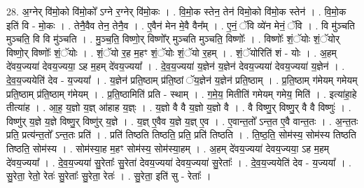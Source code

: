 \documentclass[17pt]{extarticle}
\begin{document}
28. अ॒ग्नेर् वि॑मो॒को वि॑मो॒को᳚ ऽग्ने र॒ग्नेर् वि॑मो॒कः । . वि॒मो॒क स्तेन॒ तेन॑ विमो॒को वि॑मो॒क स्तेन॑ । . वि॒मो॒क इति॑ वि - मो॒कः । . तेनै॒वैव तेन॒ तेनै॒व । . ए॒वैन॑ मेन मे॒वै वैन᳚म् । . ए॒नं॒ ॅवि व्ये॑न मेनं॒ ॅवि । . वि मु॑ञ्चति मुञ्चति॒ वि वि मु॑ञ्चति । . मु॒ञ्च॒ति॒ विष्णो॒र् विष्णो᳚र् मुञ्चति मुञ्चति॒ विष्णोः᳚ । . विष्णोः᳚ शं॒ॅयोः शं॒ॅयोर् विष्णो॒र् विष्णोः᳚ शं॒ॅयोः । . शं॒ॅयो र॒ह म॒हꣳ शं॒ॅयोः शं॒ॅयो र॒हम् । . शं॒ॅयोरिति॑ शं - योः । . अ॒हम् दे॑वय॒ज्यया॑ देवय॒ज्यया॒ ऽह म॒हम् दे॑वय॒ज्यया᳚ । . दे॒व॒य॒ज्यया॑ य॒ज्ञेन॑ य॒ज्ञेन॑ देवय॒ज्यया॑ देवय॒ज्यया॑ य॒ज्ञेन॑ । . दे॒व॒य॒ज्ययेति॑ देव - य॒ज्यया᳚ । . य॒ज्ञेन॑ प्रति॒ष्ठाम् प्र॑ति॒ष्ठां ॅय॒ज्ञेन॑ य॒ज्ञेन॑ प्रति॒ष्ठाम् । . प्र॒ति॒ष्ठाम् ग॑मेयम् गमेयम् प्रति॒ष्ठाम् प्र॑ति॒ष्ठाम् ग॑मेयम् । . प्र॒ति॒ष्ठामिति॑ प्रति - स्थाम् । . ग॒मे॒य॒ मितीति॑ गमेयम् गमेय॒ मिति॑ । . इत्या॑हा॒हे तीत्या॑ह । . आ॒ह॒ य॒ज्ञो य॒ज्ञ् आ॑हाह य॒ज्ञ्ः । . य॒ज्ञो वै वै य॒ज्ञो य॒ज्ञो वै । . वै विष्णु॒र् विष्णु॒र् वै वै विष्णुः॑ । . विष्णु॑र् य॒ज्ञे य॒ज्ञे विष्णु॒र् विष्णु॑र् य॒ज्ञे । . य॒ज्ञ् ए॒वैव य॒ज्ञे य॒ज्ञ् ए॒व । . ए॒वान्त॒तो᳚ ऽन्त॒त ए॒वै वान्त॒तः । . अ॒न्त॒तः प्रति॒ प्रत्य॑न्त॒तो᳚ ऽन्त॒तः प्रति॑ । . प्रति॑ तिष्ठति तिष्ठति॒ प्रति॒ प्रति॑ तिष्ठति । . ति॒ष्ठ॒ति॒ सोम॑स्य॒ सोम॑स्य तिष्ठति तिष्ठति॒ सोम॑स्य । . सोम॑स्या॒ह म॒हꣳ सोम॑स्य॒ सोम॑स्या॒हम् । . अ॒हम् दे॑वय॒ज्यया॑ देवय॒ज्यया॒ ऽह म॒हम् दे॑वय॒ज्यया᳚ । . दे॒व॒य॒ज्यया॑ सु॒रेताः᳚ सु॒रेता॑ देवय॒ज्यया॑ देवय॒ज्यया॑ सु॒रेताः᳚ । . दे॒व॒य॒ज्ययेति॑ देव - य॒ज्यया᳚ । . सु॒रेता॒ रेतो॒ रेतः॑ सु॒रेताः᳚ सु॒रेता॒ रेतः॑ । . सु॒रेता॒ इति॑ सु - रेताः᳚ । \newline
\end{document}

